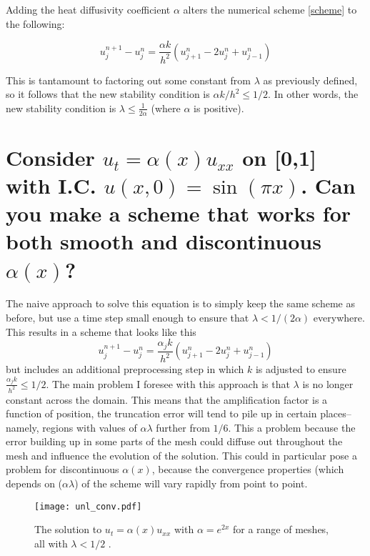 \documentclass[11pt]{amsart}
\begin{document}
Adding the heat diffusivity coefficient $\alpha$ alters the numerical scheme \eqref{scheme} to the following: 

\begin{equation} 
u_j^{n+1} - u_j^n = \frac{\alpha k }{h^2}  (u_{j+1}^n - 2u_j^n + u_{j-1}^n)
\end{equation} 

This is tantamount to factoring out some constant from $\lambda$ as previously defined, so it follows that the new stability condition is  $\alpha k/h^2 \le 1/2$. In other words, the new stability condition is  $\lambda \le \frac{1}{2\alpha}$ (where $\alpha$ is positive). 


\section{Consider $u_t = \alpha(x) u_{xx}$ on [0,1] with I.C. $u(x,0)= \sin(\pi x)$. Can you make a scheme that works for both smooth and  discontinuous $\alpha(x)$? }

The naive approach to solve this equation is to simply keep the same scheme as before, but use a time step small enough to ensure that $\lambda < 1/(2\alpha)$ everywhere. This results in a scheme that looks like this
\begin{equation} 
u_j^{n+1} - u_j^n = \frac{\alpha_j k }{h^2}  (u_{j+1}^n - 2u_j^n + u_{j-1}^n)
\end{equation} 
but includes an additional preprocessing step in which $k$ is adjusted to ensure $\frac{\alpha_j k }{h^2} \le 1/2$. The main problem I foresee with this approach is that $\lambda$ is no longer constant across the domain. This means that the amplification factor is a function of position, the truncation error will tend to pile up in certain places-- namely, regions with values of $\alpha\lambda$ further from $1/6$. This a problem because  the error building up in some parts of the mesh could diffuse out throughout the mesh and influence the evolution of the solution. This could in particular pose a problem for discontinuous $\alpha(x)$, because the convergence properties (which depends on ($\alpha\lambda$) of the scheme will vary rapidly from point to point.  

\begin{figure}
\begin{center} 
\texttt{[image: unl\_conv.pdf]}
\caption{The solution to $u_t =\alpha(x) u_{xx}$ with  $\alpha = e^{2x} $ for a range of meshes, all with $\lambda < 1/2$ .  }
\label{nlexp} 
\end{center}
\end{figure}
\end{document}
